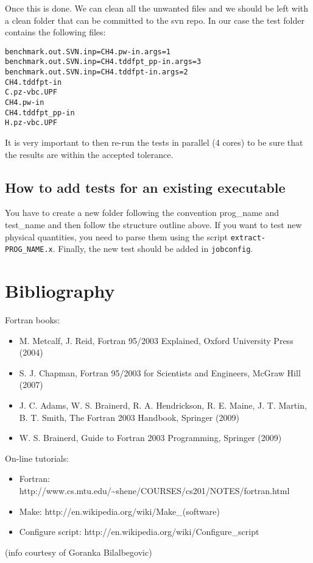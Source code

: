 \documentclass[12pt,a4paper]{article}
\begin{document}
\begin{description}
Once this is done. We can clean all the unwanted files and we should be left with a clean folder that can be committed to the svn repo. In our case the test folder contains the following files:
\begin{verbatim}
benchmark.out.SVN.inp=CH4.pw-in.args=1      
benchmark.out.SVN.inp=CH4.tddfpt_pp-in.args=3 
benchmark.out.SVN.inp=CH4.tddfpt-in.args=2 
CH4.tddfpt-in    
C.pz-vbc.UPF 
CH4.pw-in                                      
CH4.tddfpt_pp-in  
H.pz-vbc.UPF
\end{verbatim}

It is very important to then re-run the tests in parallel (4 cores) to be sure that the results are within the accepted tolerance. 

\end{description}


\subsection{How to add tests for an existing executable}

You have to create a new folder following the convention prog\_name and test\_name and then follow the structure outline above. 
If you want to test new physical quantities, you need to parse them using the script \texttt{extract-PROG\_NAME.x}. Finally, the new test should 
be added in \texttt{jobconfig}.

\section{Bibliography}

Fortran books:
\begin{itemize}
\item
M. Metcalf, J. Reid, Fortran 95/2003 Explained, Oxford University Press (2004)
\item
S. J. Chapman, Fortran 95/2003 for Scientists and Engineers, McGraw Hill (2007)
\item
J. C. Adams, W. S. Brainerd, R. A. Hendrickson, R. E. Maine, J. T. Martin,
B. T. Smith, The Fortran 2003 Handbook, Springer (2009)
\item
W. S. Brainerd, Guide to Fortran 2003 Programming, Springer (2009)
\end{itemize}
On-line tutorials:
\begin{itemize}
\item Fortran:
http://www.cs.mtu.edu/\~{}shene/COURSES/cs201/NOTES/fortran.html
\item Make:
http://en.wikipedia.org/wiki/Make\_(software)
\item Configure script:
http://en.wikipedia.org/wiki/Configure\_script
\end{itemize}
(info courtesy of Goranka Bilalbegovic)
\end{document}
